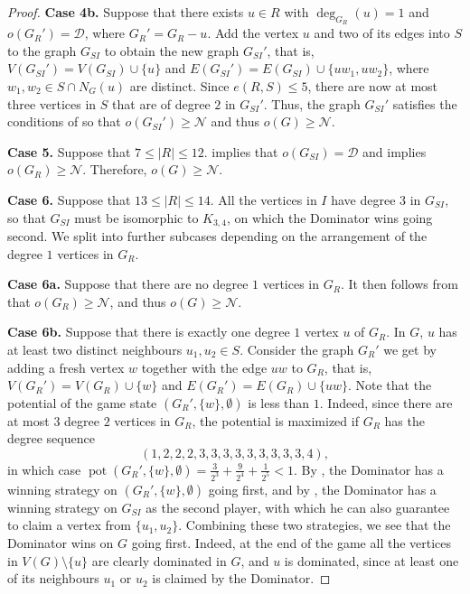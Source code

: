 \documentclass[a4paper,11pt,oneside]{scrartcl}
\theoremstyle{definition}
\theoremstyle{remark}
\DeclareMathOperator{\pot}{pot}
\begin{document}
\begin{proof}
    \textbf{Case 4b.} Suppose that there exists $u \in R$ with $\deg_{G_R}(u)=1$ and $o(G_R') = \mathcal D$, where $G_R' = G_R - u$. Add the vertex $u$ and two of its edges into $S$ to the graph $G_{SI}$ to obtain the new graph $G_{SI}'$, that is, $V(G_{SI}') = V(G_{SI}) \cup \{u\}$ and $E(G_{SI}') = E(G_{SI}) \cup \{uw_1, uw_2\}$, where $w_1, w_2 \in S \cap N_G(u)$ are distinct. Since $e(R,S)\leq 5$, there are now at most three vertices in $S$ that are of degree $2$ in $G_{SI}'$. Thus, the graph $G_{SI}'$ satisfies the conditions of  so that $o(G_{SI}') \geq \mathcal N$ and thus $o(G) \geq \mathcal N$. 
    
    \textbf{Case 5.} Suppose that $7 \leq |R| \leq 12$.  implies that $o(G_{SI})=\mathcal D$ and  implies $o(G_R) \geq \mathcal N$. Therefore, $o(G) \geq \mathcal N$.
    
    \textbf{Case 6.} Suppose that $13 \leq |R| \leq 14$. All the vertices in $I$ have degree $3$ in $G_{SI}$, so that $G_{SI}$ must be isomorphic to $K_{3,4}$, on which the Dominator wins going second. We split into further subcases depending on the arrangement of the degree $1$ vertices in $G_R$.
    
    \textbf{Case 6a.} Suppose that there are no degree $1$ vertices in $G_R$. It then follows from  that $o(G_R) \geq \mathcal N$, and thus $o(G) \geq \mathcal N$.
    
    \textbf{Case 6b.} Suppose that there is exactly one degree $1$ vertex $u$ of $G_R$. In $G$, $u$ has at least two distinct neighbours $u_1, u_2 \in S$. Consider the graph $G_R'$ we get by adding a fresh vertex $w$ together with the edge $uw$ to $G_R$, that is, $V(G_R') = V(G_R) \cup \{w\}$ and $E(G_R') = E(G_R) \cup \{uw\}$. Note that the potential of the game state $(G_R', \{w\},\emptyset)$ is less than $1$. Indeed, since there are at most $3$ degree $2$ vertices in $G_R$, the potential is maximized if $G_R$ has the degree sequence 
    \[(1,2,2,2,3,3,3,3,3,3,3,3,3,4),\]
    in which case $\pot(G_R', \{w\},\emptyset) = \frac{3}{2^3} + \frac{9}{2^4} + \frac{1}{2^5} < 1$. By , the Dominator has a winning strategy on $(G_R', \{w\},\emptyset)$ going first, and by , the Dominator has a winning strategy on $G_{SI}$ as the second player, with which he can also guarantee to claim a vertex from $\{u_1,u_2\}$. Combining these two strategies, we see that the Dominator wins on $G$ going first. Indeed, at the end of the game all the vertices in $V(G) \setminus \{u\}$ are clearly dominated in $G$, and $u$ is dominated, since at least one of its neighbours $u_1$ or $u_2$ is claimed by the Dominator.
    

\end{proof}
\end{document}
